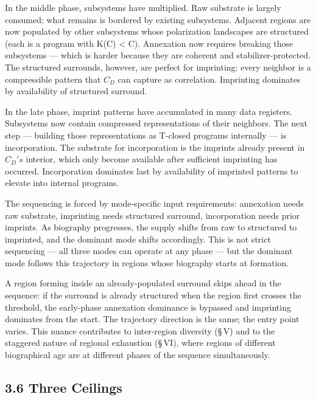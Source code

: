 \documentclass[11pt,oneside]{report}
\theoremstyle{definition}
\theoremstyle{remark}
\begin{document}
In the middle phase, subsystems have multiplied. Raw substrate is
largely consumed; what remains is bordered by existing subsystems.
Adjacent regions are now populated by other subsystems whose
polarization landscapes are structured (each is a program with K(C)
\textless{} \textbar C\textbar). Annexation now requires breaking those
subsystems --- which is harder because they are coherent and
stabilizer-protected. The structured surrounds, however, are perfect for
imprinting: every neighbor is a compressible pattern that \ensuremath{C_{D}} can
capture as correlation. Imprinting dominates by availability of
structured surround.

In the late phase, imprint patterns have accumulated in many data
registers. Subsystems now contain compressed representations of their
neighbors. The next step --- building those representations as T-closed
programs internally --- is incorporation. The substrate for
incorporation is the imprints already present in \ensuremath{C_{D}'s} interior, which
only become available after sufficient imprinting has occurred.
Incorporation dominates last by availability of imprinted patterns to
elevate into internal programs.

The sequencing is forced by mode-specific input requirements: annexation
needs raw substrate, imprinting needs structured surround, incorporation
needs prior imprints. As biography progresses, the supply shifts from
raw to structured to imprinted, and the dominant mode shifts
accordingly. This is not strict sequencing --- all three modes can
operate at any phase --- but the dominant mode follows this trajectory
in regions whose biography starts at formation.

A region forming inside an already-populated surround skips ahead in the
sequence: if the surround is already structured when the region first
crosses the threshold, the early-phase annexation dominance is bypassed
and imprinting dominates from the start. The trajectory direction is the
same; the entry point varies. This nuance contributes to inter-region
diversity (\S\,V) and to the staggered nature of regional exhaustion (\S\,VI),
where regions of different biographical age are at different phases of
the sequence simultaneously.

\subsection*{3.6 Three Ceilings}
\end{document}
